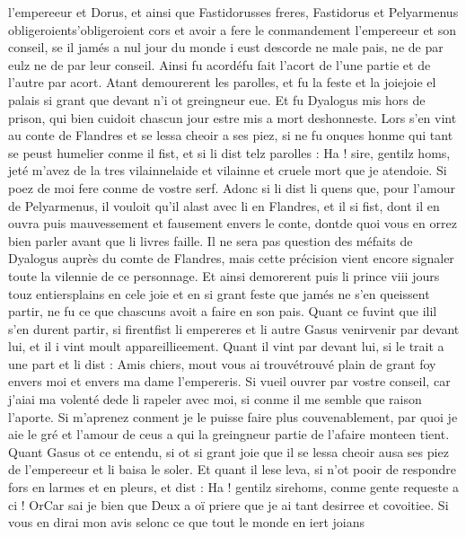 \documentclass{article}
\begin{document}
\begin{pages}
   l’empereeur et 
      Dorus, et ainsi que 
   Fastidorusses freres, Fastidorus 
   et Pelyarmenus 
   obligeroients'obligeroient cors et avoir a fere le conmandement 
   l’empereeur et son conseil, se il jamés a nul jour du monde i eust descorde ne male pais, 
   ne de par eulz ne de par leur conseil. 
    Ainsi fu acordéfu fait l'acort 
      de l’une partie et de l’autre par acort. \pend
\pstart Atant demourerent les parolles, et fu la feste et 
   la joiejoie el palais si grant que devant n’i ot greingneur eue. 
   Et fu Dyalogus mis hors de prison, qui bien cuidoit chascun jour estre mis a mort deshonneste.
   Lors s’en vint au conte de Flandres et 
   se lessa cheoir a ses piez, si ne fu onques honme qui tant se peust humelier conme il fist, et si li dist 
   telz parolles :
   Ha ! sire, gentilz homs, jeté m’avez de la tres 
      vilainnelaide et vilainne et cruele mort que je atendoie. Si poez 
      de moi fere conme de vostre serf.
   Adonc si li dist li quens que, pour l’amour de 
   Pelyarmenus, il vouloit qu’il alast avec li en Flandres, 
   et il si fist, dont il en ouvra puis mauvessement et fausement envers le conte, 
   dontde quoi vous 
      en orrez bien parler avant que li livres faille. 
   Il ne sera pas question des méfaits de Dyalogus auprès du comte de Flandres, mais cette précision
   vient encore signaler toute la vilennie de ce personnage.
   Et ainsi demorerent puis li prince viii jours touz entiersplains 
   en cele joie et en si grant feste que jamés ne s’en queissent partir, ne fu ce que chascuns avoit a faire en son pais. \pend
\pstart Quant ce 
   fuvint que 
   ilil s'en durent partir, 
   si firentfist li empereres 
   et li autre Gasus 
   venirvenir par devant lui, 
   et il i vint moult appareillieement. Quant il vint par devant lui, si le trait a une part et li dist :
   Amis chiers, mout vous ai trouvétrouvé plain 
      de grant foy envers moi et envers ma dame l’empereris. 
      Si vueil ouvrer par vostre conseil, car j’aiai ma volenté 
      dede li rapeler avec moi, si conme il me semble que raison l’aporte. 
   Si m’aprenez conment je le puisse faire plus couvenablement, par quoi je aie le gré et l’amour de ceus a qui la greingneur 
      partie de l’afaire monteen tient.
   Quant Gasus ot ce entendu, si ot si grant joie que il se lessa cheoir 
   ausa ses piez de 
      l’empereeur et li baisa le soler. Et quant il 
   lese leva, si n’ot pooir de respondre fors en larmes et en pleurs, et dist :
   Ha ! gentilz sirehoms, 
      conme gente requeste a ci ! OrCar sai je bien que Deux a oï 
      priere que je ai tant desirree et covoitiee. Si vous en dirai mon avis selonc ce que tout le monde en iert joians 

\end{pages}
\end{document}
